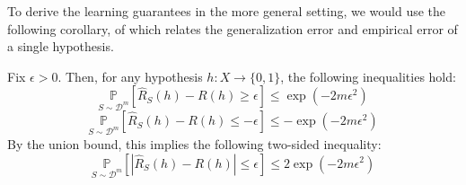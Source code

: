 To derive the learning guarantees in the more general setting, we would use the following corollary, of which relates the generalization error and empirical error of a single hypothesis. 
\begin{col}
    Fix $\epsilon > 0$. Then, for any hypothesis $h: X \to \{0,1\}$, the following inequalities hold: 
    \begin{equation}
        \underset{S\sim \mathcal{D}^m}{\mathbb{P}} \left[\hat{R}_S (h) - R(h) \geq \epsilon\right] \leq \exp{(-2m\epsilon^2)}
    \end{equation}
    \begin{equation}
        \underset{S\sim \mathcal{D}^m}{\mathbb{P}} \left[\hat{R}_S (h) - R(h) \leq -\epsilon\right] \leq -\exp{(-2m\epsilon^2)}
    \end{equation}
    By the union bound, this implies the following two-sided inequality: 
    \begin{equation}
        \underset{S\sim \mathcal{D}^m}{\mathbb{P}} \left[|\hat{R}_S (h) - R(h)| \leq \epsilon\right] \leq 2\exp{(-2m\epsilon^2)}
    \end{equation}
\end{col}

